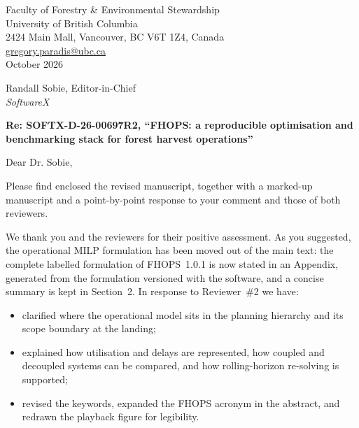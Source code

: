 \documentclass[10pt]{article}
\begin{document}
\begin{flushright}
Faculty of Forestry \& Environmental Stewardship\\
University of British Columbia\\
2424 Main Mall, Vancouver, BC V6T 1Z4, Canada\\
\href{mailto:gregory.paradis@ubc.ca}{gregory.paradis@ubc.ca}\\[0.5em]
October 2026
\end{flushright}

Randall Sobie, Editor-in-Chief\\
\textit{SoftwareX}

\textbf{Re: SOFTX-D-26-00697R2, ``FHOPS: a reproducible optimisation and benchmarking stack for forest harvest operations''}

Dear Dr. Sobie,

Please find enclosed the revised manuscript, together with a marked-up manuscript and a point-by-point response to your comment and those of both reviewers.

We thank you and the reviewers for their positive assessment. As you suggested, the operational MILP formulation has been moved out of the main text: the complete labelled formulation of FHOPS~1.0.1 is now stated in an Appendix, generated from the formulation versioned with the software, and a concise summary is kept in Section~2. In response to Reviewer~\#2 we have:
\begin{itemize}
  \item clarified where the operational model sits in the planning hierarchy and its scope boundary at the landing;
  \item explained how utilisation and delays are represented, how coupled and decoupled systems can be compared, and how rolling-horizon re-solving is supported;
  \item revised the keywords, expanded the FHOPS acronym in the abstract, and redrawn the playback figure for legibility.
\end{itemize}
\end{document}
